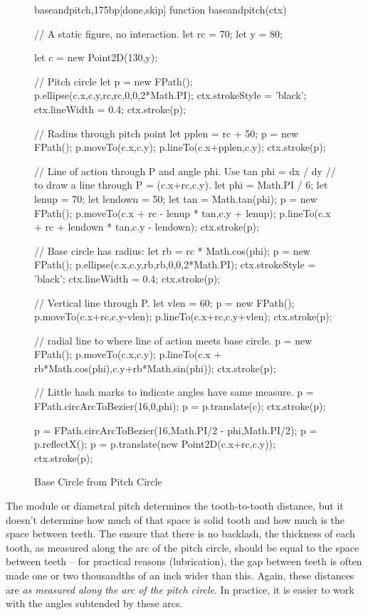 \documentclass[10pt]{article}
\begin{document}
\begin{figure}[b!]
\begin{figput}{baseandpitch,175bp}[done,skip]
function baseandpitch(ctx) {

  // A static figure, no interaction.
  let rc = 70;
  let y = 80;

  let c = new Point2D(130,y);

  // Pitch circle
  let p = new FPath();
  p.ellipse(c.x,c.y,rc,rc,0,0,2*Math.PI);
  ctx.strokeStyle = 'black';
  ctx.lineWidth = 0.4;
  ctx.stroke(p);

  // Radius through pitch point
  let pplen = rc + 50;
  p = new FPath();
  p.moveTo(c.x,c.y);
  p.lineTo(c.x+pplen,c.y);
  ctx.stroke(p);
  
  // Line of action through P and angle phi. Use tan phi = dx / dy
  // to draw a line through P = (c.x+rc,c.y).
  let phi = Math.PI / 6;
  let lenup = 70;
  let lendown = 50;
  let tan = Math.tan(phi);
  p = new FPath();
  p.moveTo(c.x + rc - lenup * tan,c.y + lenup);
  p.lineTo(c.x + rc + lendown * tan,c.y - lendown);
  ctx.stroke(p);
  
  // Base circle has radius:
  let rb = rc * Math.cos(phi);
  p = new FPath();
  p.ellipse(c.x,c.y,rb,rb,0,0,2*Math.PI);
  ctx.strokeStyle = 'black';
  ctx.lineWidth = 0.4;
  ctx.stroke(p);

  // Vertical line through P.
  let vlen = 60;
  p = new FPath();
  p.moveTo(c.x+rc,c.y-vlen);
  p.lineTo(c.x+rc,c.y+vlen);
  ctx.stroke(p);

  // radial line to where line of action meets base circle.
  p = new FPath();
  p.moveTo(c.x,c.y);
  p.lineTo(c.x + rb*Math.cos(phi),c.y+rb*Math.sin(phi));
  ctx.stroke(p);

  // Little hash marks to indicate angles have same measure.
  p = FPath.circArcToBezier(16,0,phi);
  p = p.translate(c);
  ctx.stroke(p);
  
  p = FPath.circArcToBezier(16,Math.PI/2 - phi,Math.PI/2);
  p = p.reflectX();
  p = p.translate(new Point2D(c.x+rc,c.y));
  ctx.stroke(p);
}

\end{figput}
\caption{Base Circle from Pitch Circle}
\label{fig-base-from-pitch}
\end{figure}


The module or diametral pitch determines the tooth-to-tooth distance,
but it doesn't determine how much of that space is solid tooth and how
much is the space between teeth. The ensure that there is no backlash,
the thickness of each tooth, as measured along the arc of the pitch
circle, should be equal to the space between teeth -- for practical
reasons (lubrication), the gap between teeth is often made one or two 
thousandths of an inch wider than this. Again, these distances are
\emph{as measured along the arc of the pitch circle}. In practice, it
is easier to work with the angles subtended by these arcs.
\end{document}
